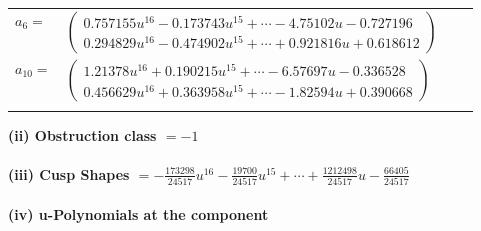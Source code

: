 \documentclass[1p]{elsarticle_modified}
\theoremstyle{definition}
\begin{document}
\begin{tabular}{m{7pt} m{180pt} m{7pt} m{180pt} }
\flushright $a_{6}=$&$\begin{pmatrix}0.757155 u^{16}-0.173743 u^{15}+\cdots-4.75102 u-0.727196\\0.294829 u^{16}-0.474902 u^{15}+\cdots+0.921816 u+0.618612\end{pmatrix}$ \\
\flushright $a_{10}=$&$\begin{pmatrix}1.21378 u^{16}+0.190215 u^{15}+\cdots-6.57697 u-0.336528\\0.456629 u^{16}+0.363958 u^{15}+\cdots-1.82594 u+0.390668\end{pmatrix}$\\&\end{tabular}
\flushleft \textbf{(ii) Obstruction class $= -1$}\\~\\
\flushleft \textbf{(iii) Cusp Shapes $= -\frac{173298}{24517} u^{16}-\frac{19700}{24517} u^{15}+\cdots+\frac{1212498}{24517} u-\frac{66405}{24517}$}\\~\\
\newpage\renewcommand{\arraystretch}{1}
\flushleft \textbf{(iv) u-Polynomials at the component}\newline \\
\end{document}
